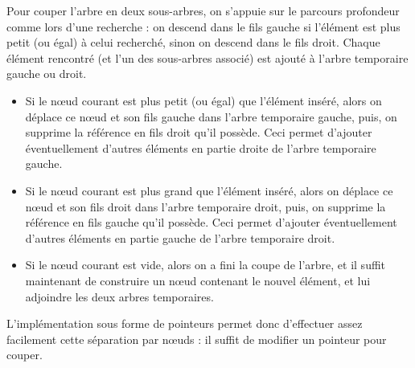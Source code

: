 \documentclass[11pt,a4paper]{article}
\begin{document}


Pour couper l'arbre en deux sous-arbres, on s'appuie sur le parcours profondeur comme lors d'une recherche : on descend dans le fils gauche si l'élément est plus petit (ou égal) à celui recherché, sinon on descend dans le fils droit.
Chaque élément rencontré (et l'un des sous-arbres associé) est ajouté à l'arbre temporaire gauche ou droit.

\begin{itemize}[leftmargin=0.5cm]
\item Si le nœud courant est plus petit (ou égal) que l'élément inséré, alors on déplace ce nœud et son fils gauche dans l'arbre temporaire gauche, puis, on supprime la référence en fils droit qu'il possède.
Ceci permet d'ajouter éventuellement d'autres éléments en partie droite de l'arbre temporaire gauche.

\item Si le nœud courant est plus grand que l'élément inséré, alors on déplace ce nœud et son fils droit dans l'arbre temporaire droit, puis, on supprime la référence en fils gauche qu'il possède.
Ceci permet d'ajouter éventuellement d'autres éléments en partie gauche de l'arbre temporaire droit.

\item Si le nœud courant est vide, alors on a fini la coupe de l'arbre, et il suffit maintenant de construire un nœud contenant le nouvel élément, et lui adjoindre les deux arbres temporaires.
\end{itemize}

L'implémentation sous forme de pointeurs permet donc d'effectuer assez facilement cette séparation par nœuds : il suffit de modifier un pointeur pour couper.

\bigskip
\end{document}
